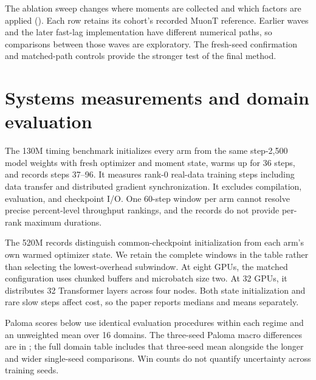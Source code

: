 The ablation sweep changes where moments are collected and which factors are applied (). Each row retains its cohort's recorded MuonT reference. Earlier waves and the later fast-lag implementation have different numerical paths, so comparisons between those waves are exploratory. The fresh-seed confirmation and matched-path controls provide the stronger test of the final method.



\FloatBarrier
\section{Systems measurements and domain evaluation}
\label{app:appendix_systems}

The 130M timing benchmark initializes every arm from the same step-2,500 model weights with fresh optimizer and moment state, warms up for 36 steps, and records steps 37--96. It measures rank-0 real-data training steps including data transfer and distributed gradient synchronization. It excludes compilation, evaluation, and checkpoint I/O. One 60-step window per arm cannot resolve precise percent-level throughput rankings, and the records do not provide per-rank maximum durations.



The 520M records distinguish common-checkpoint initialization from each arm's own warmed optimizer state. We retain the complete windows in the table rather than selecting the lowest-overhead subwindow. At eight GPUs, the matched configuration uses chunked buffers and microbatch size two. At 32 GPUs, it distributes 32 Transformer layers across four nodes. Both state initialization and rare slow steps affect cost, so the paper reports medians and means separately.



Paloma scores below use identical evaluation procedures within each regime and an unweighted mean over 16 domains. The three-seed Paloma macro differences are in ; the full domain table includes that three-seed mean alongside the longer and wider single-seed comparisons. Win counts do not quantify uncertainty across training seeds.


